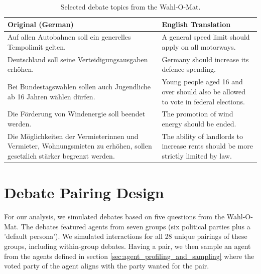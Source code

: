 \begin{table}[htbp]
    \centering
    \caption{Selected debate topics from the Wahl-O-Mat.}
    \label{tab:questionnaire}
    \begin{tabularx}{\textwidth}{@{} XX @{}}
        \toprule
        \textbf{Original (German)} & \textbf{English Translation} \\
        \midrule
        
        Auf allen Autobahnen soll ein generelles Tempolimit gelten. &
        A general speed limit should apply on all motorways. \\
        \midrule
        
        Deutschland soll seine Verteidigungsausgaben erhöhen. &
        Germany should increase its defence spending. \\
        \midrule
        
        Bei Bundestagswahlen sollen auch Jugendliche ab 16 Jahren wählen dürfen. &
        Young people aged 16 and over should also be allowed to vote in federal elections. \\
        \midrule
        
        Die Förderung von Windenergie soll beendet werden. &
        The promotion of wind energy should be ended. \\
        \midrule
        
        Die Möglichkeiten der Vermieterinnen und Vermieter, Wohnungsmieten zu erhöhen, sollen gesetzlich stärker begrenzt werden. &
        The ability of landlords to increase rents should be more strictly limited by law. \\
        
        \bottomrule
    \end{tabularx}
\end{table}

\section{Debate Pairing Design}

For our analysis, we simulated debates based on five questions from the Wahl-O-Mat. The debates featured agents from seven groups (six political parties plus a 'default persona'). We simulated interactions for all 28 unique pairings of these groups, including within-group debates. Having a pair, we then sample an agent from the agents defined in section \ref{sec:agent_profiling_and_sampling} where the voted party of the agent aligns with the party wanted for the pair. 

